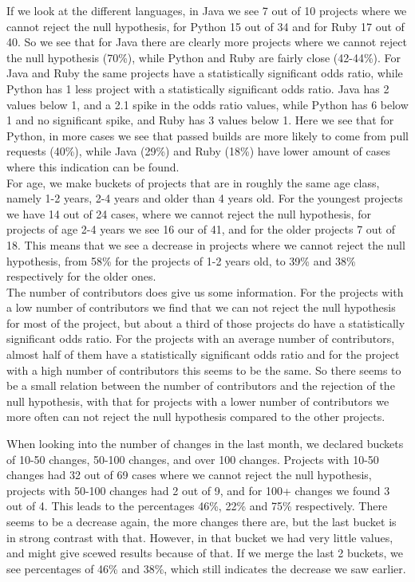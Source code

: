 \documentclass[a4paper,11pt]{article}
\begin{document}
			If we look at the different languages, in Java we see 7 out of 10 projects where we cannot reject the null hypothesis, for Python 15 out of 34 and for Ruby 17 out of 40. So we see that for Java there are clearly more projects where we cannot reject the null hypothesis (70\%), while Python and Ruby are fairly close (42-44\%). For Java and Ruby the same projects have a statistically significant odds ratio, while Python has 1 less project with a statistically significant odds ratio. Java has 2 values below 1, and a 2.1 spike in the odds ratio values, while Python has 6 below 1 and no significant spike, and Ruby has 3 values below 1. Here we see that for Python, in more cases we see that passed builds are more likely to come from pull requests (40\%), while Java (29\%) and Ruby (18\%) have lower amount of cases where this indication can be found. \\

			For age, we make buckets of projects that are in roughly the same age class, namely 1-2 years, 2-4 years and older than 4 years old. For the youngest projects we have 14 out of 24 cases, where we cannot reject the null hypothesis, for projects of age 2-4 years we see 16 our of 41, and for the older projects 7 out of 18. This means that we see a decrease in projects where we cannot reject the null hypothesis, from 58\% for the projects of 1-2 years old, to 39\% and 38\% respectively for the older ones. \\
			
			The number of contributors does give us some information.
			For the projects with a low number of contributors we find that we can not reject the null hypothesis for most of the
			project, but about a third of those projects do have a statistically significant odds ratio.
			For the projects with an average number of contributors, almost half of them have a statistically significant odds
			ratio and for the project with a high number of contributors this seems to be the same.
			So there seems to be a small relation between the number of contributors and the rejection of the null hypothesis,
			with that for projects with a lower number of contributors we more often can not reject the null hypothesis compared
			to the other projects.

			When looking into the number of changes in the last month, we declared buckets of 10-50 changes, 50-100 changes, and over 100 changes. Projects with 10-50 changes had 32 out of 69 cases where we cannot reject the null hypothesis, projects with 50-100 changes had 2 out of 9, and for 100+ changes we found 3 out of 4. This leads to the percentages 46\%, 22\% and 75\% respectively. There seems to be a decrease again, the more changes there are, but the last bucket is in strong contrast with that. However, in that bucket we had very little values, and might give scewed results because of that. If we merge the last 2 buckets, we see percentages of 46\% and 38\%, which still indicates the decrease we saw earlier.
\end{document}
